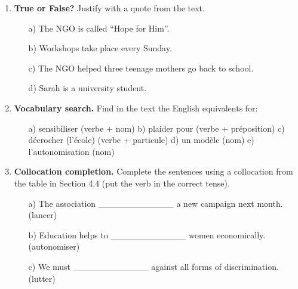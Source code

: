 \documentclass[11pt]{article}
\begin{document}
\begin{exercice}
\begin{enumerate}
    \item \textbf{True or False?} Justify with a quote from the text.
    \begin{itemize}
        \item[a)] The NGO is called “Hope for Him”.
        \item[b)] Workshops take place every Sunday.
        \item[c)] The NGO helped three teenage mothers go back to school.
        \item[d)] Sarah is a university student.
    \end{itemize}
    \item \textbf{Vocabulary search.} Find in the text the English equivalents for:
    \begin{itemize}
        \item[a) sensibiliser (verbe + nom) \quad b) plaider pour (verbe + préposition) \quad c) décrocher (l'école) (verbe + particule) \quad d) un modèle (nom) \quad e) l'autonomisation (nom)]
    \end{itemize}
    \item \textbf{Collocation completion.} Complete the sentences using a collocation from the table in Section 4.4 (put the verb in the correct tense).
    \begin{itemize}
        \item[a)] The association \_\_\_\_\_\_\_\_\_\_\_\_ a new campaign next month. (lancer)
        \item[b)] Education helps to \_\_\_\_\_\_\_\_\_\_\_\_ women economically. (autonomiser)
        \item[c)] We must \_\_\_\_\_\_\_\_\_\_\_\_ against all forms of discrimination. (lutter)
    \end{itemize}
\end{enumerate}
\end{exercice}
\end{document}
